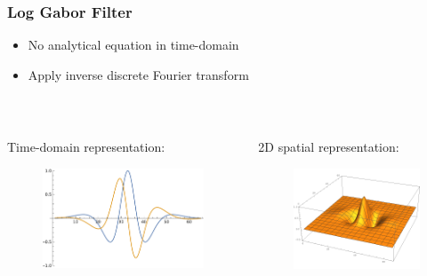 \documentclass{beamer}
\begin{document}
\begin{frame}
    [fragile] \frametitle{Log Gabor Filter}
    \begin{itemize}
        \item No analytical equation in time-domain
        \item Apply inverse discrete Fourier transform
    \end{itemize}

\

    \begin{columns}
        \begin{column}{0.45\textwidth}
            Time-domain representation:
            \begin{figure}
                [t] \centering
                \includegraphics[width=\textwidth]{gabor/log_gabor.pdf} \label{fig:gabor}
            \end{figure}
        \end{column}
        \begin{column}{0.45\textwidth}
            2D spatial representation:
            \begin{figure}
                [t] \centering
                \includegraphics[width=\textwidth]{gabor/log_gabor_2d.png} \label{fig:gabor}
            \end{figure}
        \end{column}
    \end{columns}
\end{frame}
\end{document}
